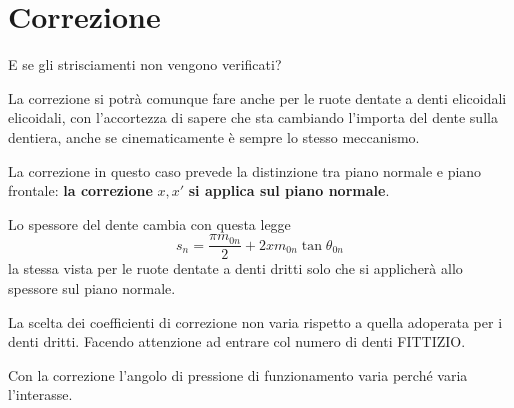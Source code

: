 \documentclass[a4paper, 15pt]{article}
\begin{document}
\section{Correzione}
\begin{adjustwidth}{2in}{}
	E se gli strisciamenti non vengono verificati?
	
	La correzione si potrà comunque fare anche per le ruote dentate a denti elicoidali elicoidali, con l'accortezza di sapere che sta cambiando l'importa del dente sulla dentiera, anche se cinematicamente è sempre lo stesso meccanismo. 
	
	La correzione in questo caso prevede la distinzione tra piano normale e piano frontale: \textbf{la correzione} $x, x'$ \textbf{si applica sul piano normale}. \newline 
	
	Lo spessore del dente cambia con questa legge 
	\[s_n = \dfrac{\pi m_{0n}}{2} + 2xm_{0n}\tan\theta_{0n}\]
	la stessa vista per le ruote dentate a denti dritti solo che si applicherà allo spessore sul piano normale. \newline 
	
	La scelta dei coefficienti di correzione non varia rispetto a quella adoperata per i denti dritti. Facendo attenzione ad entrare col numero di denti FITTIZIO. \newline 
	
	Con la correzione l'angolo di pressione di funzionamento varia perché varia l'interasse. 
	

\end{adjustwidth}
\end{document}
